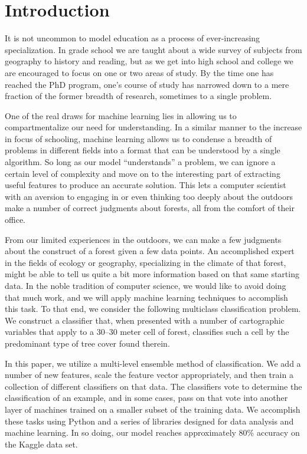 \section{Introduction}
\label{sec:-intro}

It is not uncommon to model education as a process of ever-increasing 
specialization. In grade school we are taught about a wide survey of
subjects from geography to history and reading, but as we get into high 
school and college we are encouraged to focus on one or two areas of 
study.  By the time one has reached the PhD program, one's course of 
study has narrowed down to a mere fraction of the former breadth of 
research, sometimes to a single problem.

One of the real draws for machine learning lies in allowing us to 
compartmentalize our need for understanding. In a similar manner to the increase in
focus of schooling, machine learning allows us to condense a breadth of problems
in different fields into a format that can be understood by a single algorithm.
So long as our model 
``understands'' a problem, we can ignore a certain level of complexity 
and move on to the interesting part of extracting useful features to
produce an accurate solution.  This lets a computer scientist 
with an aversion to engaging in or even thinking too deeply about the 
outdoors make a number of correct judgments about forests, 
all from the comfort of their office.

From our limited experiences in the outdoors, we can make a few judgments about
the construct of a forest given a few data points. An accomplished expert 
in the fields of ecology or geography, specializing in the climate of 
that forest, might be able to tell us quite a bit more information based 
on that same starting data.  In the noble tradition of computer science, we 
would like to avoid doing that much work, and we will apply machine 
learning techniques to accomplish this task.  To that end, we consider 
the following multiclass classification problem. We construct a 
classifier that, when presented with a number of cartographic variables 
that apply to a 30--30 meter cell of forest, classifies such a cell by 
the predominant type of tree cover found therein.

In this paper, we utilize a multi-level ensemble method of 
classification.  We add a number of new features, scale the feature 
vector appropriately, and then train a collection of different 
classifiers on that data.  The classifiers vote to determine the 
classification of an example, and in some cases, pass on that vote into 
another layer of machines trained on a smaller subset of the training 
data.  We accomplish these tasks using Python and a series of libraries 
designed for data analysis and machine learning.  In so doing, our model 
reaches approximately 80\% accuracy on the Kaggle data set. 






